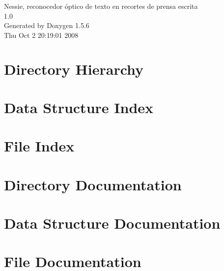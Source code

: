 \documentclass[a4paper]{book}
\begin{document}
\begin{titlepage}
\vspace*{7cm}
\begin{center}
{\Large Nessie, reconocedor óptico de texto en recortes de prensa escrita \\[1ex]\large 1.0 }\\
\vspace*{1cm}
{\large Generated by Doxygen 1.5.6}\\
\vspace*{0.5cm}
{\small Thu Oct 2 20:19:01 2008}\\
\end{center}
\end{titlepage}
\clearemptydoublepage
{}
\tableofcontents
\clearemptydoublepage
{}
\chapter{Directory Hierarchy}

\chapter{Data Structure Index}

\chapter{File Index}

\chapter{Directory Documentation}


\chapter{Data Structure Documentation}








\chapter{File Documentation}




















\printindex
\end{document}
